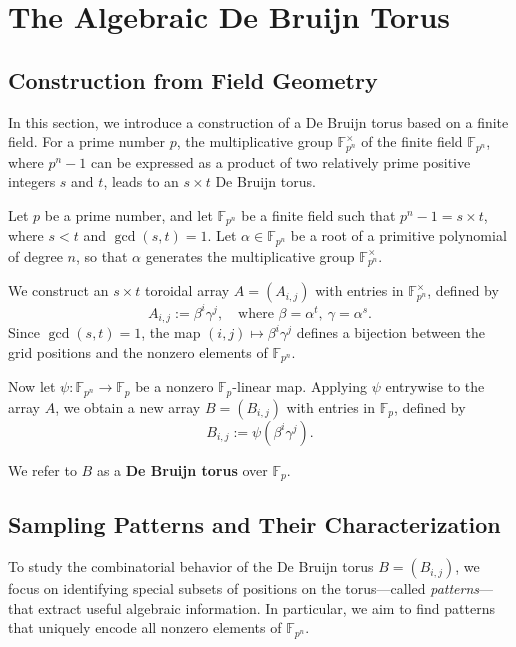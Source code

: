 \documentclass{article}
\begin{document}
\section{The Algebraic De Bruijn Torus}

\subsection{Construction from Field Geometry}\label{construction}
In this section, we introduce a construction of a De Bruijn torus based on a finite field.
For a prime number $p$, the multiplicative group $\mathbb{F}_{p^n}^{\times}$ of the finite field $\mathbb{F}_{p^n}$, where $p^n-1$ can be expressed as a product of two relatively prime positive integers $s$ and $t$, leads to an $s\times t$ De Bruijn torus. 


Let \( p \) be a prime number, and let \( \mathbb{F}_{p^n} \) be a finite field such that \( p^n - 1 = s \times t \), where \( s < t \) and \( \gcd(s, t) = 1 \). Let \( \alpha \in \mathbb{F}_{p^n} \) be a root of a primitive polynomial of degree \( n \), so that \( \alpha \) generates the multiplicative group \( \mathbb{F}_{p^n}^\times \).

We construct an \( s \times t \) toroidal array \( A = (A_{i,j}) \) with entries in \( \mathbb{F}_{p^n}^\times \), defined by
\[
A_{i,j} := \beta^i \gamma^j, \quad \text{where } \beta = \alpha^t, \ \gamma = \alpha^s.
\]
Since \( \gcd(s, t) = 1 \), the map \( (i,j) \mapsto \beta^i \gamma^j \) defines a bijection between the grid positions and the nonzero elements of \( \mathbb{F}_{p^n} \).

Now let \( \psi: \mathbb{F}_{p^n} \to \mathbb{F}_p \) be a nonzero \( \mathbb{F}_p \)-linear map. Applying \( \psi \) entrywise to the array \( A \), we obtain a new array \( B = (B_{i,j}) \) with entries in \( \mathbb{F}_p \), defined by
\[
B_{i,j} := \psi(\beta^i \gamma^j).
\]

We refer to \( B \) as a \textbf{De Bruijn torus} over \( \mathbb{F}_p \).

\subsection{Sampling Patterns and Their Characterization  }

To study the combinatorial behavior of the De Bruijn torus \( B = (B_{i,j}) \), we focus on identifying special subsets of positions on the torus—called \emph{patterns}—that extract useful algebraic information. In particular, we aim to find patterns that uniquely encode all nonzero elements of \( \mathbb{F}_{p^n} \).
\end{document}
